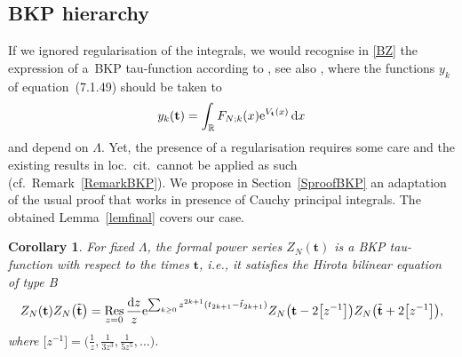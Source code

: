 \documentclass[10pt,a4paper]{amsart}
\numberwithin{equation}{section}
\newcommand{\dd}{\mathrm{d}}
\newtheorem{Corollary}[Theorem]{Corollary}
\begin{document}
\subsection{BKP hierarchy}

If we ignored regularisation of the integrals, we would recognise in \eqref{BZ} the expression of a~BKP tau-function according to
\cite{Nimmo_1990}, see also \cite[Section~7.1.2.3]{harnad_balogh_2021}, where the functions $y_k$ of equation~(7.1.49) should be taken to
\[
y_k(\mathbf{t}) = \int_{\mathbb{R}} F_{N;k}(x) {\rm e}^{V_{\mathbf{t}}(x)}\,\dd x
\]
and depend on $\Lambda$. Yet, the presence of a regularisation
requires some care and the existing results in loc.\ cit.\ cannot be
applied as such (cf.\ Remark~\ref{RemarkBKP}). We propose in
Section~\ref{SproofBKP} an adaptation of the usual proof that works in
presence of Cauchy principal integrals. The obtained
Lemma~\ref{lemfinal} covers our case.


\begin{Corollary}
 \label{Comain} For fixed $\Lambda$, the formal power series
 $Z_N(\mathbf{t})$ is a BKP tau-function with respect to the times
 $\mathbf{t}$, i.e., it satisfies the Hirota bilinear equation of
 type B
\begin{equation}
\label{biline}
Z_N(\mathbf{t})Z_N\bigl(\tilde{\mathbf{t}}\bigr) = \mathop{{\rm Res}}_{z = 0} \frac{\dd z}{z} {\rm e}^{\sum_{k \geq 0} z^{2k + 1}(t_{2k + 1} - \tilde{t}_{2k + 1})} Z_N\bigl(\mathbf{t} - 2\bigl[z^{-1}\bigr]\bigr) Z_N\bigl(\tilde{\mathbf{t}} + 2\bigl[z^{-1}\bigr]\bigr),
\end{equation}
where $\bigl[z^{-1}\bigr] = \bigl(\frac{1}{z},\frac{1}{3z^3},\frac{1}{5z^5},\dots\bigr)$.
\end{Corollary}
\end{document}
